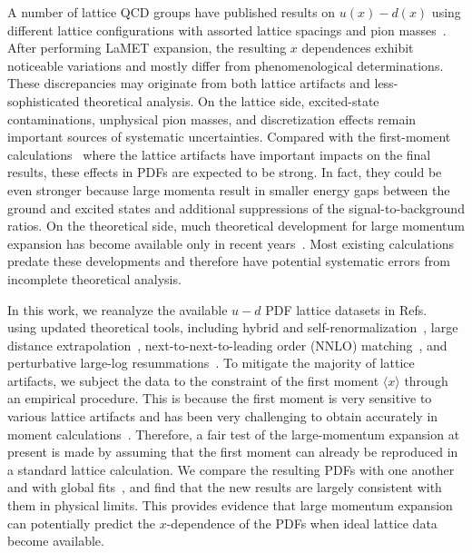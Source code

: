 \documentclass[prl,aps,twocolumn,preprintnumbers, showpacs, nofootinbib,superscriptaddress,notitlepage]{revtex4-1}
\begin{document}
A number of lattice QCD groups have published results on $u(x)-d(x)$ using different lattice configurations with assorted lattice spacings and pion masses~\cite{Lin:2014zya,Alexandrou:2015rja,Chen:2016utp,Alexandrou:2016jqi,Alexandrou:2018pbm,Chen:2018xof,LatticeParton:2018gjr,Alexandrou:2019lfo,Joo:2020spy,Fan:2020nzz,Alexandrou:2020qtt,Lin:2020fsj,Gao:2022uhg,Chen:2024rgi,Gao:2026hix}. After
performing LaMET expansion, the resulting $x$ dependences exhibit noticeable variations and mostly differ from phenomenological determinations. These discrepancies may originate from both lattice artifacts and less-sophisticated theoretical analysis. On the lattice side, excited-state contaminations, unphysical pion masses, and discretization effects remain important sources of systematic uncertainties. Compared with the first-moment calculations~\cite{Mondal:2020ela,Djukanovic:2024krw} where the lattice artifacts have important impacts on the final results, these effects in PDFs are expected to be strong. In fact, they could be even stronger because large momenta result in smaller energy gaps between the ground and excited states and additional suppressions of the signal-to-background ratios. On the theoretical side, 
much theoretical development for large momentum expansion has become available only in recent years~\cite{Ji:2020brr,LatticePartonLPC:2021gpi,Chou:2022drv,Zhang:2023bxs,Ji:2026vir,Li:2020xml,Chen:2020ody,Su:2022fiu,Ji:2023pba,Liu:2023onm,Ji:2024hit}. Most existing calculations predate these developments and therefore have potential systematic errors from incomplete theoretical analysis. 

In this work, we reanalyze the available $u-d$ PDF lattice datasets in Refs.~\cite{LatticeParton:2018gjr,Alexandrou:2020qtt,Lin:2020fsj,Chen:2024rgi} using updated theoretical tools, including hybrid and self-renormalization~\cite{Ji:2020brr,LatticePartonLPC:2021gpi,Chou:2022drv}, large distance extrapolation~\cite{Ji:2026vir}, next-to-next-to-leading order (NNLO) matching~\cite{Li:2020xml,Chen:2020ody}, and perturbative large-log resummations~\cite{Zhang:2023bxs,Su:2022fiu,Ji:2023pba,Liu:2023onm,Ji:2024hit}. To mitigate the majority of lattice artifacts, we subject the data to the constraint of the first moment $\langle x \rangle$ through an empirical procedure. This is 
because the first moment is very sensitive to various lattice artifacts
and has been very challenging to obtain accurately in moment calculations~\cite{Mondal:2020ela,Djukanovic:2024krw}. Therefore, a fair test
of the large-momentum expansion at present is made by assuming that the first moment can already be reproduced in a standard lattice calculation. 
We compare the resulting PDFs with one another and with global fits~\cite{Harland-Lang:2014zoa,Hou:2019efy}, and 
find that the new results are largely consistent with them in physical limits. This provides evidence that large momentum expansion can potentially predict the $x$-dependence of the PDFs when ideal lattice data become available. 
\end{document}
